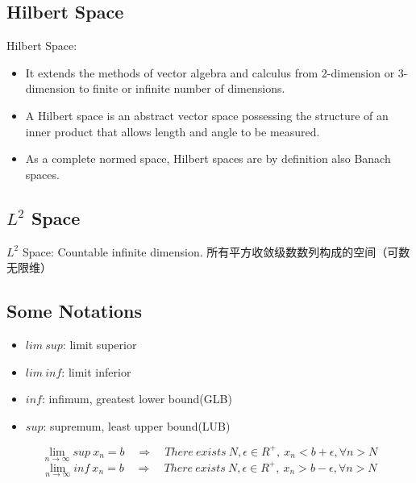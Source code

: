 \documentclass[12pt]{article}
\begin{document}
\subsection{Hilbert Space}
Hilbert Space:
\begin{itemize}
    \item It extends the methods of vector algebra and calculus from 2-dimension or 3-dimension to finite or infinite number of dimensions.
    \item A Hilbert space is an abstract vector space possessing the structure of an inner product that allows length and angle to be measured.
    \item As a complete normed space, Hilbert spaces are by definition also Banach spaces.
\end{itemize}



\subsection{$L^2$ Space}
$L^2$ Space: Countable infinite dimension. 所有平方收敛级数数列构成的空间（可数无限维）

\subsection{Some Notations}
\begin{itemize}
    \item $lim\ sup$: limit superior
    \item $lim\ inf$: limit inferior
    \item $inf$: infimum, greatest lower bound(GLB)
    \item $sup$: supremum, least upper bound(LUB)
\end{itemize}

$$\lim_{n\to\infty}sup\ x_n=b\quad\Rightarrow\quad There\ exists\ N, \epsilon\in R^+,\ x_n < b+\epsilon, \forall n>N$$
$$\lim_{n\to\infty}inf\ x_n=b\quad\Rightarrow\quad There\ exists\ N, \epsilon\in R^+,\ x_n > b-\epsilon, \forall n>N$$
\end{document}
